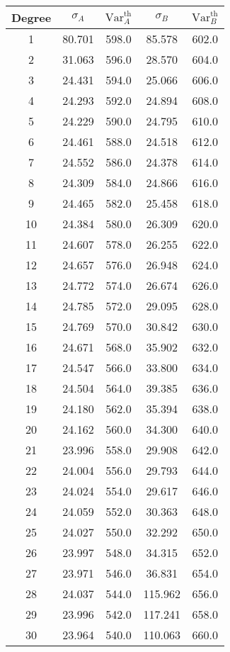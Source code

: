 \begin{tabular}{c c c c c}
\toprule
Degree & $\sigma_A$ & $\mathrm{Var}_A^{\text{th}}$ & $\sigma_B$ & $\mathrm{Var}_B^{\text{th}}$ \\
\midrule
1 & 80.701 & 598.0 & 85.578 & 602.0 \\
2 & 31.063 & 596.0 & 28.570 & 604.0 \\
3 & 24.431 & 594.0 & 25.066 & 606.0 \\
4 & 24.293 & 592.0 & 24.894 & 608.0 \\
5 & 24.229 & 590.0 & 24.795 & 610.0 \\
6 & 24.461 & 588.0 & 24.518 & 612.0 \\
7 & 24.552 & 586.0 & 24.378 & 614.0 \\
8 & 24.309 & 584.0 & 24.866 & 616.0 \\
9 & 24.465 & 582.0 & 25.458 & 618.0 \\
10 & 24.384 & 580.0 & 26.309 & 620.0 \\
11 & 24.607 & 578.0 & 26.255 & 622.0 \\
12 & 24.657 & 576.0 & 26.948 & 624.0 \\
13 & 24.772 & 574.0 & 26.674 & 626.0 \\
14 & 24.785 & 572.0 & 29.095 & 628.0 \\
15 & 24.769 & 570.0 & 30.842 & 630.0 \\
16 & 24.671 & 568.0 & 35.902 & 632.0 \\
17 & 24.547 & 566.0 & 33.800 & 634.0 \\
18 & 24.504 & 564.0 & 39.385 & 636.0 \\
19 & 24.180 & 562.0 & 35.394 & 638.0 \\
20 & 24.162 & 560.0 & 34.300 & 640.0 \\
21 & 23.996 & 558.0 & 29.908 & 642.0 \\
22 & 24.004 & 556.0 & 29.793 & 644.0 \\
23 & 24.024 & 554.0 & 29.617 & 646.0 \\
24 & 24.059 & 552.0 & 30.363 & 648.0 \\
25 & 24.027 & 550.0 & 32.292 & 650.0 \\
26 & 23.997 & 548.0 & 34.315 & 652.0 \\
27 & 23.971 & 546.0 & 36.831 & 654.0 \\
28 & 24.037 & 544.0 & 115.962 & 656.0 \\
29 & 23.996 & 542.0 & 117.241 & 658.0 \\
30 & 23.964 & 540.0 & 110.063 & 660.0 \\
\bottomrule
\end{tabular}
